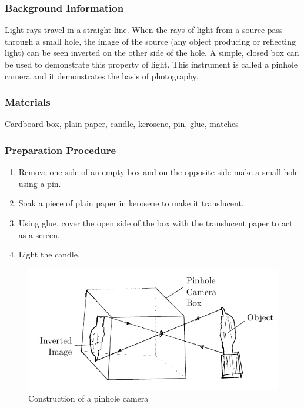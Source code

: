 \subsubsection*{Background Information}
Light rays travel in a straight line.  When the rays of light from a source pass through a small hole, the image of the source (any object producing or reflecting light) can be seen inverted on the other side of the hole.  A simple, closed box can be used to demonstrate this property of light.  This instrument is called a pinhole camera and it demonstrates the basis of photography.

\subsubsection*{Materials}
Cardboard box, plain paper, candle, kerosene, pin, glue, matches


\subsubsection*{Preparation Procedure}
\begin{enumerate}
\item{Remove one side of an empty box and on the opposite side make a small hole using a pin.} 
\item{Soak a piece of plain paper in kerosene to make it translucent.} 
\item{Using glue, cover the open side of the box with the translucent paper to act as a screen.} 
\item{Light the candle.} 
\end{enumerate}

\begin{figure}
\begin{center}
\includegraphics{./img/pinhole-camera.png}
\caption{Construction of a pinhole camera}
\label{fig:pinhole-camera}
\end{center}
\end{figure}

